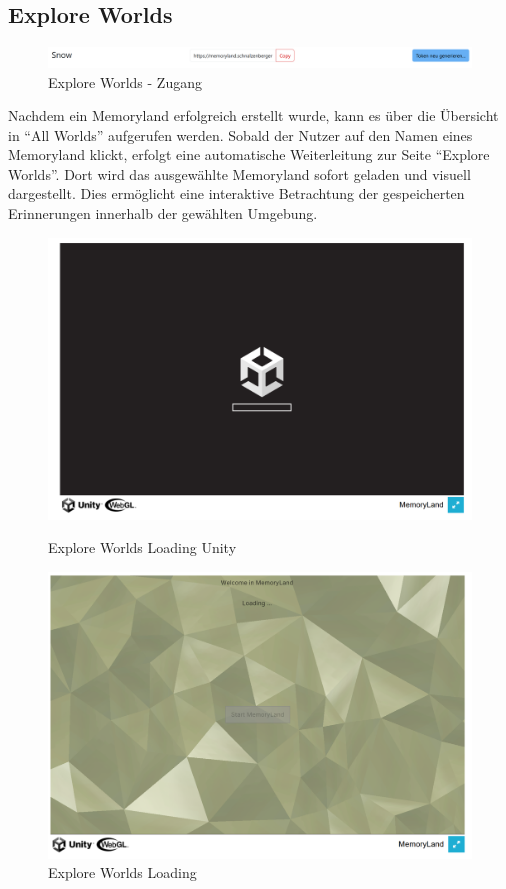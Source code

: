 \subsection{Explore Worlds}


\begin{figure} [h t]
    \centering
    \includegraphics[scale=0.45]{pics/explore_worlds_header.PNG}
    \caption{Explore Worlds - Zugang}
    \label{fig:explore-worlds-overview}
\end{figure}

Nachdem ein Memoryland erfolgreich erstellt wurde, kann es über die Übersicht in ``All Worlds'' aufgerufen werden. 
Sobald der Nutzer auf den Namen eines Memoryland klickt, erfolgt eine automatische Weiterleitung 
zur Seite ``Explore Worlds''. Dort wird das ausgewählte Memoryland sofort geladen 
und visuell dargestellt. Dies ermöglicht eine interaktive Betrachtung der gespeicherten 
Erinnerungen innerhalb der gewählten Umgebung.


\begin{figure} [h t]
    \centering
    \includegraphics[scale=0.5]{pics/explore_worlds_loading_unity.PNG}
    \caption{Explore Worlds Loading Unity}
    \label{fig:explore-worlds-loading-unity}

    \centering
    \includegraphics[scale=0.5]{pics/explore_worlds_loading.PNG}
    \caption{Explore Worlds Loading}
    \label{fig:explore-worlds-loading}
\end{figure}

